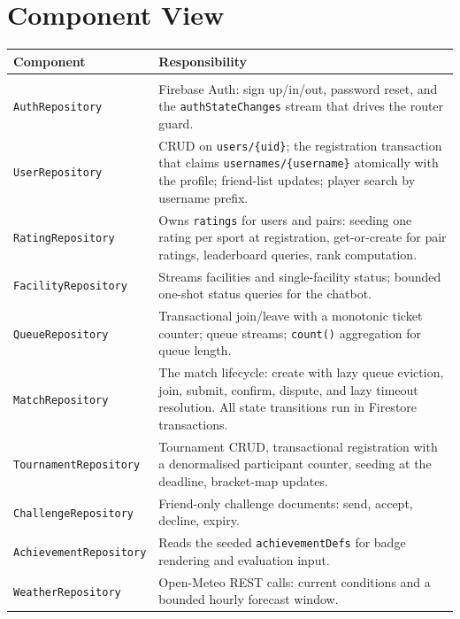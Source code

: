 \documentclass{configurations/polimi3i_thesis}
\renewcommand{\_}{\textunderscore\allowbreak}
\begin{document}
\section{Component View}
\label{sec:component_view}

\begin{table}[H]
    \centering
    \small
    \begin{tabularx}{\textwidth}{l X}
        \textbf{Component} & \textbf{Responsibility} \\\hline\\[-9px]
        \texttt{AuthRepository} & Firebase Auth: sign up/in/out, password reset, and the \texttt{authStateChanges} stream that drives the router guard. \\[3px]
        \texttt{UserRepository} & CRUD on \texttt{users/\{uid\}}; the registration transaction that claims \texttt{usernames/\{username\}} atomically with the profile; friend-list updates; player search by username prefix. \\[3px]
        \texttt{RatingRepository} & Owns \texttt{ratings} for users and pairs: seeding one rating per sport at registration, get-or-create for pair ratings, leaderboard queries, rank computation. \\[3px]
        \texttt{FacilityRepository} & Streams facilities and single-facility status; bounded one-shot status queries for the chatbot. \\[3px]
        \texttt{QueueRepository} & Transactional join/leave with a monotonic ticket counter; queue streams; \texttt{count()} aggregation for queue length. \\[3px]
        \texttt{MatchRepository} & The match lifecycle: create with lazy queue eviction, join, submit, confirm, dispute, and lazy timeout resolution. All state transitions run in Firestore transactions. \\[3px]
        \texttt{TournamentRepository} & Tournament CRUD, transactional registration with a denormalised participant counter, seeding at the deadline, bracket-map updates. \\[3px]
        \texttt{ChallengeRepository} & Friend-only challenge documents: send, accept, decline, expiry. \\[3px]
        \texttt{AchievementRepository} & Reads the seeded \texttt{achievementDefs} for badge rendering and evaluation input. \\[3px]
        \texttt{WeatherRepository} & Open-Meteo REST calls: current conditions and a bounded hourly forecast window. \\[3px]

\end{tabularx}
\end{table}
\end{document}
